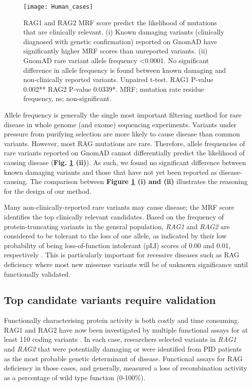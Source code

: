 \documentclass[preprint,11pt,fleqn]{elsarticle}
\begin{document}
\begin{figure}[h]
\hspace*{0cm}   %
	\texttt{[image: Human\_cases]}
	\caption{RAG1 and RAG2 MRF score predict the likelihood of mutations that are clinically relevant. 
(i) Known damaging variants (clinically diagnosed with genetic confirmation) reported on GnomAD have significantly higher MRF scores than unreported variants. 
(ii) GnomAD rare variant allele frequency <0.0001. 
No significant difference in allele frequency is found between known damaging and non-clinically reported variants. Unpaired t-test. 
RAG1 P-value 0.002** RAG2 P-value 0.0339*. MRF; mutation rate residue frequency, ns; non-significant.}
	\label{fig:Human_cases}
\end{figure}

Allele frequency is generally the single most important filtering method for rare disease in whole genome (and exome) sequencing experiments. 
Variants under pressure from purifying selection are more likely to cause disease than common variants.
However, most RAG mutations are rare.
Therefore, allele frequencies of rare variants reported on GnomAD cannot differentially predict the likelihood of causing disease
(\textbf{Fig. \ref{fig:Human_cases} (ii)}). 
As such, we found no significant difference between known damaging variants and those that have not yet been reported as disease-causing. 
The comparison between \textbf{Figure \ref{fig:Human_cases} (i) and (ii)} illustrates the reasoning for the design of our method. 

Many non-clinically-reported rare variants may cause disease; the MRF score identifies the top clinically relevant candidates. 
Based on the frequency of protein-truncating variants in the general population, \textit{RAG1} and \textit{RAG2} are considered to be tolerant to the loss of one allele, as indicated by their low probability of being loss-of-function intolerant (pLI) scores of 0.00 and 0.01, respectively 
\citep{lek2016analysis}. 
This is particularly important for recessive diseases such as RAG deficiency where most new missense variants will be of unknown significance until functionally validated.

\subsection*{\textbf{Top candidate variants require validation}}
\noindent Functionally characterising protein activity is both costly and time consuming.
RAG1 and RAG2 have now been investigated by multiple functional assays for at least 110 coding variants 
\citep{lee2014systematic, tirosh2018recombination, lawless2018prevalence}.
In each case, researchers selected variants in \textit{RAG1} and \textit{RAG2} that were potentially damaging or were identified from PID patients as the most probable genetic determinant of disease. 
Functional assays for RAG deficiency in those cases, and generally, measured a loss of recombination activity as a percentage of wild type function (0-100\%). 
\end{document}
